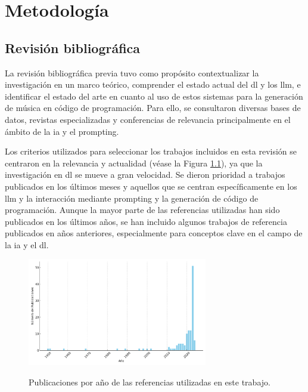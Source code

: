 \chapter{Metodología}





\section{Revisión bibliográfica}

La revisión bibliográfica previa tuvo como propósito contextualizar la investigación en un marco teórico, comprender el estado actual del \gls{dl} y los \gls{llm}, e identificar el estado del arte en cuanto al uso de estos sistemas para la generación de música en código de programación.
Para ello, se consultaron diversas bases de datos, revistas especializadas y conferencias de relevancia principalmente en el ámbito de la \gls{ia} y el prompting. 

Los criterios utilizados para seleccionar los trabajos incluidos en esta revisión se centraron en la relevancia y actualidad (véase la Figura \ref{fig:publications_per_year_referencias}), ya que la investigación en \gls{dl} se mueve a gran velocidad. Se dieron prioridad a trabajos publicados en los últimos meses y aquellos que se centran específicamente en  los \gls{llm} y la interacción mediante prompting y la generación de código de programación.
Aunque la mayor parte de las referencias utilizadas han sido publicados en los últimos años, se han incluido algunos trabajos de referencia publicados en años anteriores, especialmente para conceptos clave en el campo de la \gls{ia} y el \gls{dl}.

\begin{figure}[h]
    \caption[Publicaciones por año de las referencias utilizadas]{Publicaciones por año de las referencias utilizadas en este trabajo.}
    \centering
    \includegraphics[width=0.7\textwidth]{./figuras/publications_per_year_referencias.png}
    \source{\propio}
    \label{fig:publications_per_year_referencias}
\end{figure}


